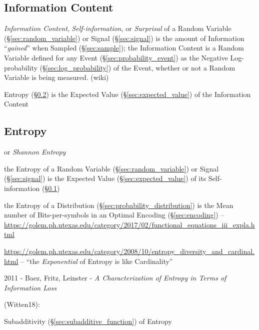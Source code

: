\subsection{Information Content}\label{sec:information_content}

\emph{Information Content}, \emph{Self-information}, or \emph{Surprisal} of a
Random Variable (\S\ref{sec:random_variable}) or Signal (\S\ref{sec:signal}) is
the amount of Information ``\emph{gained}'' when Sampled (\S\ref{sec:sample});
the Information Content is a Random Variable defined for any Event
(\S\ref{sec:probability_event}) as the Negative Log-probability
(\S\ref{sec:log_probability}) of the Event, whether or not a Random Variable is
being measured. (wiki)

Entropy (\S\ref{sec:entropy}) is the Expected Value
(\S\ref{sec:expected_value}) of the Information Content



\subsection{Entropy}\label{sec:entropy}

or \emph{Shannon Entropy}

the Entropy of a Random Variable (\S\ref{sec:random_variable}) or Signal
(\S\ref{sec:signal}) is the Expected Value (\S\ref{sec:expected_value}) of its
Self-information (\S\ref{sec:information_content})

the Entropy of a Distribution (\S\ref{sec:probability_distribution})
is the Mean number of Bits-per-symbols in an Optimal Encoding
(\S\ref{sec:encoding}) --
\url{https://golem.ph.utexas.edu/category/2017/02/functional_equations_iii_expla.html}

\url{https://golem.ph.utexas.edu/category/2008/10/entropy_diversity_and_cardinal.html}
-- ``the \emph{Exponential} of Entropy is like Cardinality''

2011 - Baez, Fritz, Leinster - \emph{A Characterization of Entropy in Terms of
  Information Loss}

\asterism

(Witten18):

Subadditivity (\S\ref{sec:subadditive_function}) of Entropy

